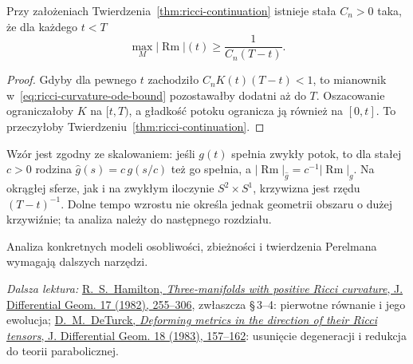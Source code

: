 \begin{wniosek}
\label{cor:ricci-minimal-blowup}
Przy założeniach Twierdzenia~\ref{thm:ricci-continuation}
istnieje stała $C_n>0$ taka, że dla każdego $t<T$
\begin{equation}\label{eq:ricci-minimal-blowup}
 \max_M|\operatorname{Rm}|(t)
 \geq \frac{1}{C_n(T-t)}.
\end{equation}
\end{wniosek}
\begin{proof}
Gdyby dla pewnego $t$ zachodziło
$C_nK(t)(T-t)<1$, to mianownik
w~\eqref{eq:ricci-curvature-ode-bound}
pozostawałby dodatni aż do $T$.
Oszacowanie ograniczałoby $K$ na $[t,T)$,
a gładkość potoku ogranicza ją również na
$[0,t]$. To przeczyłoby
Twierdzeniu~\ref{thm:ricci-continuation}.
\end{proof}

Wzór jest zgodny ze skalowaniem: jeśli $g(t)$
spełnia zwykły potok, to dla stałej $c>0$
rodzina $\widehat g(s)=c\,g(s/c)$ też go spełnia,
a $|\operatorname{Rm}|_{\widehat g}
=c^{-1}|\operatorname{Rm}|_g$.
Na okrągłej sferze, jak i na zwykłym iloczynie
$S^2\times S^1$, krzywizna jest rzędu
$(T-t)^{-1}$. Dolne tempo wzrostu
nie określa jednak geometrii obszaru
o dużej krzywiźnie; ta analiza należy do
następnego rozdziału.

Analiza konkretnych modeli osobliwości, zbieżności
i twierdzenia Perelmana wymagają dalszych narzędzi.

\par\smallskip
{\footnotesize\noindent\emph{Dalsza lektura:}
\href{https://projecteuclid.org/journals/journal-of-differential-geometry/volume-17/issue-2/Three-manifolds-with-positive-Ricci-curvature/10.4310/jdg/1214436922.full}
{R.\ S.\ Hamilton, \emph{Three-manifolds with positive Ricci
curvature}, J. Differential Geom. 17 (1982), 255--306},
zwłaszcza \S\,3--4: pierwotne równanie i jego ewolucja;
\href{https://projecteuclid.org/journals/journal-of-differential-geometry/volume-18/issue-1/Deforming-metrics-in-the-direction-of-their-Ricci-tensors/10.4310/jdg/1214509286.full}
{D.\ M.\ DeTurck, \emph{Deforming metrics in the direction
of their Ricci tensors}, J. Differential Geom. 18 (1983),
157--162}: usunięcie degeneracji i redukcja do teorii
parabolicznej.\par}
